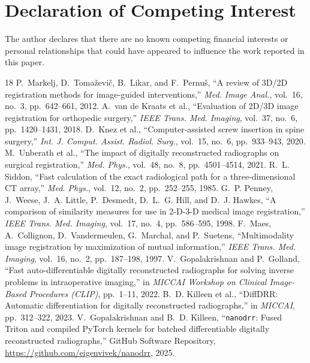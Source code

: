 \documentclass[review,12pt]{elsarticle}
\begin{document}
\section*{Declaration of Competing Interest}
The author declares that there are no known competing financial interests or personal relationships that could have appeared to influence the work reported in this paper.


\begin{thebibliography}{18}
P.~Markelj, D.~Toma\v{z}evi\v{c}, B.~Likar, and F.~Pernu\v{s}, ``A review of 3D/2D registration methods for image-guided interventions,'' \emph{Med. Image Anal.}, vol.~16, no.~3, pp.~642--661, 2012.
A.~van de Kraats et al., ``Evaluation of 2D/3D image registration for orthopedic surgery,'' \emph{IEEE Trans. Med. Imaging}, vol.~37, no.~6, pp.~1420--1431, 2018.
D.~Knez et al., ``Computer-assisted screw insertion in spine surgery,'' \emph{Int. J. Comput. Assist. Radiol. Surg.}, vol.~15, no.~6, pp.~933--943, 2020.
M.~Unberath et al., ``The impact of digitally reconstructed radiographs on surgical registration,'' \emph{Med. Phys.}, vol.~48, no.~8, pp.~4501--4514, 2021.
R.~L. Siddon, ``Fast calculation of the exact radiological path for a three-dimensional CT array,'' \emph{Med. Phys.}, vol.~12, no.~2, pp.~252--255, 1985.
G.~P. Penney, J.~Weese, J.~A. Little, P.~Desmedt, D.~L.~G. Hill, and D.~J. Hawkes, ``A comparison of similarity measures for use in 2-D-3-D medical image registration,'' \emph{IEEE Trans. Med. Imaging}, vol.~17, no.~4, pp.~586--595, 1998.
F.~Maes, A.~Collignon, D.~Vandermeulen, G.~Marchal, and P.~Suetens, ``Multimodality image registration by maximization of mutual information,'' \emph{IEEE Trans. Med. Imaging}, vol.~16, no.~2, pp.~187--198, 1997.
V.~Gopalakrishnan and P.~Golland, ``Fast auto-differentiable digitally reconstructed radiographs for solving inverse problems in intraoperative imaging,'' in \emph{MICCAI Workshop on Clinical Image-Based Procedures (CLIP)}, pp.~1--11, 2022.
B.~D. Killeen et al., ``DiffDRR: Automatic differentiation for digitally reconstructed radiographs,'' in \emph{MICCAI}, pp.~312--322, 2023.
V.~Gopalakrishnan and B.~D. Killeen, ``\texttt{nanodrr}: Fused Triton and compiled PyTorch kernels for batched differentiable digitally reconstructed radiographs,'' GitHub Software Repository, \url{https://github.com/eigenvivek/nanodrr}, 2025.

\end{thebibliography}
\end{document}
